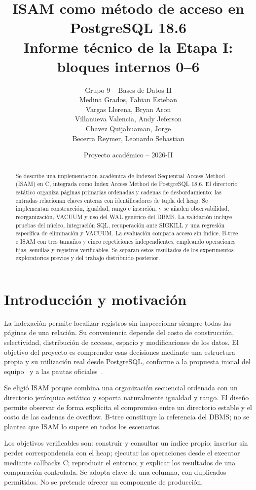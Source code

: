 \documentclass[11pt,a4paper]{article}
\title{ISAM como método de acceso en PostgreSQL 18.6\\
\large Informe técnico de la Etapa I: bloques internos 0--6}
\author{Grupo 9 -- Bases de Datos II\\[5pt]
\small Medina Grados, Fabian Esteban\\
\small Vargas Llerena, Bryan Aron\\
\small Villanueva Valencia, Andy Jeferson\\
\small Chavez Quijahuaman, Jorge\\
\small Becerra Reymer, Leonardo Sebastian}
\date{Proyecto académico -- 2026-II}
\newcommand{\code}[1]{\texttt{\detokenize{#1}}}
\begin{document}
\maketitle
\begin{abstract}
Se describe una implementación académica de Indexed Sequential Access Method
(ISAM) en C, integrada como Index Access Method de PostgreSQL 18.6. El directorio
estático organiza páginas primarias ordenadas y cadenas de desbordamiento; las
entradas relacionan claves enteras con identificadores de tupla del heap. Se
implementan construcción, igualdad, rango e inserción, y se añaden observabilidad,
reorganización, VACUUM y uso del WAL genérico del DBMS. La validación incluye
pruebas del núcleo, integración SQL, recuperación ante SIGKILL y una regresión
específica de eliminación y VACUUM. La evaluación compara acceso sin índice,
B-tree e ISAM con tres tamaños y cinco repeticiones independientes, empleando
operaciones fijas, semillas y registros verificables. Se separan estos resultados
de los experimentos exploratorios previos y del trabajo distribuido posterior.
\end{abstract}
\tableofcontents
\newpage

\section{Introducción y motivación}
La indexación permite localizar registros sin inspeccionar siempre todas las
páginas de una relación. Su conveniencia depende del costo de construcción,
selectividad, distribución de accesos, espacio y modificaciones de los datos.
El objetivo del proyecto es comprender esas decisiones mediante una estructura
propia y su utilización real desde PostgreSQL, conforme a la propuesta inicial
del equipo~\cite{propuesta} y a las pautas oficiales~\cite{rubrica}.

Se eligió ISAM porque combina una organización secuencial ordenada con un
directorio jerárquico estático y soporta naturalmente igualdad y rango. El diseño
permite observar de forma explícita el compromiso entre un directorio estable y
el costo de las cadenas de overflow. B-tree constituye la referencia del DBMS;
no se plantea que ISAM lo supere en todos los escenarios.

Los objetivos verificables son: construir y consultar un índice propio; insertar
sin perder correspondencia con el heap; ejecutar las operaciones desde el
executor mediante callbacks C; reproducir el entorno; y explicar los resultados
de una comparación controlada. Se adopta clave \code{int4} de una columna, con
duplicados permitidos. No se pretende ofrecer un componente de producción.
\end{document}

